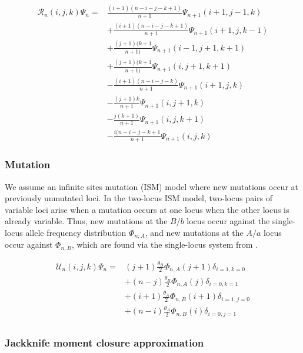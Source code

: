 \documentclass[]{article}
\begin{document}
\begin{align}
\mathcal{R}_{n}(i, j, k)\Psi_n = &
\frac{(i + 1)(n - i - j - k + 1)}{n + 1}\Psi_{n+1}(i + 1, j - 1, k) \\\nonumber
& + \frac{(i + 1)(n - i - j - k + 1)}{n + 1}\Psi_{n+1}(i + 1, j, k - 1) \\\nonumber
& + \frac{(j + 1)(k + 1}{n + 1)}\Psi_{n+1}(i - 1, j + 1, k + 1) \\\nonumber
& + \frac{(j + 1)(k + 1}{n + 1)}\Psi_{n+1}(i, j + 1, k + 1) \\\nonumber
& - \frac{(i + 1)(n - i - j - k)}{n + 1}\Psi_{n+1}(i + 1, j, k) \\\nonumber
& - \frac{(j + 1) k}{n + 1}\Psi_{n+1}(i, j + 1, k) \\\nonumber
& - \frac{j (k + 1)}{n + 1}\Psi_{n+1}(i, j, k + 1) \\\nonumber
& - \frac{i (n - i - j - k + 1}{n + 1}\Psi_{n+1}(i, j, k)
\end{align}

\subsubsection{Mutation}

We assume an infinite sites mutation (ISM) model where new mutations occur at
previously unmutated loci. In the two-locus ISM model, two-locus pairs of
variable loci arise when a mutation occurs at one locus when the other locus is
already variable. Thus, new mutations at the \(B/b\) locus occur against the
single-locus allele frequency distribution \(\Phi_{n,A}\), and new mutations at
the \(A/a\) locus occur against \(\Phi_{n, B}\), which are found via the single-locus
system from \citet{Jouganous2017-pq}.

\begin{align}
\mathcal{U}_{n}(i, j, k)\Psi_n = &
(j + 1)\frac{\theta_B}{2} \Phi_{n, A}(j+1) \delta_{i=1, k=0} \\\nonumber
& + (n - j)\frac{\theta_B}{2} \Phi_{n, A}(j) \delta_{i=0, k=1} \\\nonumber
& + (i + 1)\frac{\theta_A}{2} \Phi_{n, B}(i+1) \delta_{i=1, j=0} \\\nonumber
& + (n - i)\frac{\theta_A}{2} \Phi_{n, B}(i) \delta_{i=0, j=1} \\\nonumber
\end{align}

\subsubsection{Jackknife moment closure approximation}\label{jackknife-moment-closure-approximation}
\end{document}
